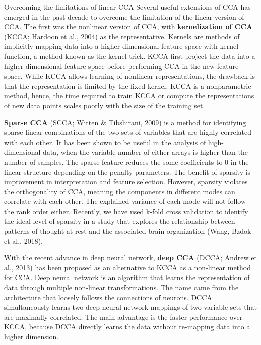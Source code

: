 \begin{infobox}{Overcoming the limitations of linear CCA}
Several useful extensions of CCA has emerged in the past decade to overcome the limitation of the linear version of CCA. The first was the nonlinear version of CCA, with \textbf{kernelization of CCA} (KCCA; Hardoon et al., 2004) as the representative.  Kernels are methods of implicitly mapping data into a higher-dimensional feature space with kernel function, a method known as the kernel trick. KCCA first project the data into a higher-dimensional feature space before performing CCA in the new feature space.  While KCCA allows learning of nonlinear representations, the drawback is that the representation is limited by the fixed kernel. KCCA is a nonparametric method, hence, the time required to train KCCA or compute the representations of new data points scales poorly with the size of the training set.

\textbf{Sparse CCA} (SCCA; Witten \& Tibshirani, 2009) is a method for identifying sparse linear combinations of the two sets of variables that are highly correlated with each other. It has been shown to be useful in the analysis of high-dimensional data, when the variable number of either arrays is higher than the number of samples. The sparse feature reduces the some coefficients to 0 in the linear structure depending on the penalty parameters. The benefit of sparsity is improvement in interpretation and feature selection. However, sparsity violates the orthogonality of CCA, meaning the components in different modes can correlate with each other. The explained variance of each mode will not follow the rank order either. Recently, we have used k-fold cross validation to identify the ideal level of sparsity in a study that explores the relationship between patterns of thought at rest and the associated brain organization (Wang, Bzdok et al., 2018).

With the recent advance in deep neural network, \textbf{deep CCA} (DCCA; Andrew et al., 2013) has been proposed as an alternative to KCCA as a non-linear method for CCA. Deep neural network is an algorithm that learns the representation of data through multiple non-linear transformations. The name came from the architecture that loosely follows the connections of neurons. DCCA simultaneously learns two deep neural network mappings of two variable sets that are maximally correlated. The main advantage is the faster performance over KCCA, because DCCA directly learns the data without re-mapping data into a higher dimension. 
\end{infobox}


